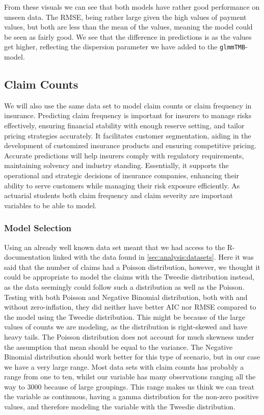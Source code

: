 \documentclass[12pt, twoside,hidelinks]{article}
\theoremstyle{definition}
\numberwithin{equation}{section}
\begin{document}
From these visuals we can see that both models have rather 
good performance on unseen data. The RMSE, being rather large given the high values of payment values, but both are less than the mean of the values, meaning the model could be seen as fairly good. We see that the difference in predictions is as the values get higher, reflecting the dispersion parameter we have added to the \texttt{glmmTMB}-model.

\newpage

\subsection{Claim Counts}\label{sec:analysis:claim_counts}
We will also use the same data set to model claim counts or claim frequency in insurance.
Predicting claim frequency is important for insurers to manage risks effectively, ensuring financial stability with enough reserve setting, and tailor pricing strategies accurately. It facilitates customer segmentation, aiding in the development of customized insurance products and ensuring competitive pricing. Accurate predictions will help insurers comply with regulatory requirements, maintaining solvency and industry standing. Essentially, it supports the operational and strategic decisions of insurance companies, enhancing their ability to serve customers while managing their risk exposure efficiently. As actuarial students both claim frequency and claim severity are important variables to be able to model.


\subsubsection{Model Selection}
Using an already well known data set meant that we had access to the R-documentation linked with the data found in \ref{sec:analysis:datasets}. Here it was said that the number of claims had a Poisson distribution, however, we thought it could be appropriate to model the claims with the Tweedie distribution instead, as the data seemingly could follow such a distribution as well as the Poisson. Testing with both Poisson and Negative Binomial distribution, both with and without zero-inflation, they did neither have better AIC nor RMSE compared to the model using the Tweedie distribution. 
This might be because of the large values of counts we are modeling, as the distribution is right-skewed and have heavy tails. The Poisson distribution does not account for much skewness under the assumption that mean should be equal to the variance. The Negative Binomial distribution should work better for this type of scenario, but in our case we have a very large range. Most data sets with claim counts has probably a range from one to ten, whilst our variable has many observations ranging all the way to 3000 because of large groupings. This range makes us think we can treat the variable as continuous, having a gamma distribution for the non-zero positive values, and therefore modeling the variable with the Tweedie distribution. 
\newline
\end{document}

